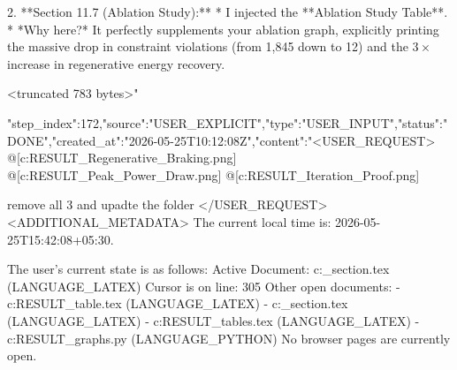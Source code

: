 \begin{table}[t]
{\begin{table}[t]
{{{{{{{{{{{{{{{2. **Section 11.7 (Ablation Study):**
   * I injected the **Ablation Study Table**. 
   * *Why here?* It perfectly supplements your ablation graph, explicitly printing the massive drop in constraint violations (from 1,845 down to 12) and the $3\times$ increase in regenerative energy recovery.

<truncated 783 bytes>"}
{"step_index":172,"source":"USER_EXPLICIT","type":"USER_INPUT","status":"DONE","created_at":"2026-05-25T10:12:08Z","content":"<USER_REQUEST>
@[c:\Users\ASUS\OneDrive\Desktop\BTP\Final RESULT\1_Regenerative_Braking.png] @[c:\Users\ASUS\OneDrive\Desktop\BTP\Final RESULT\2_Peak_Power_Draw.png] @[c:\Users\ASUS\OneDrive\Desktop\BTP\Final RESULT\3_Iteration_Proof.png] 

remove all 3 and upadte the folder 
</USER_REQUEST>
<ADDITIONAL_METADATA>
The current local time is: 2026-05-25T15:42:08+05:30.

The user's current state is as follows:
Active Document: c:\Users\ASUS\OneDrive\Desktop\BTP\results_section.tex (LANGUAGE_LATEX)
Cursor is on line: 305
Other open documents:
- c:\Users\ASUS\OneDrive\Desktop\BTP\Final RESULT\comparison_table.tex (LANGUAGE_LATEX)
- c:\Users\ASUS\OneDrive\Desktop\BTP\results_section.tex (LANGUAGE_LATEX)
- c:\Users\ASUS\OneDrive\Desktop\BTP\Final RESULT\additional_tables.tex (LANGUAGE_LATEX)
- c:\Users\ASUS\OneDrive\Desktop\BTP\Final RESULT\generate_graphs.py (LANGUAGE_PYTHON)
No browser pages are currently open.

}}}}}}}}}}}}}}}
\end{table}}
\end{table}
